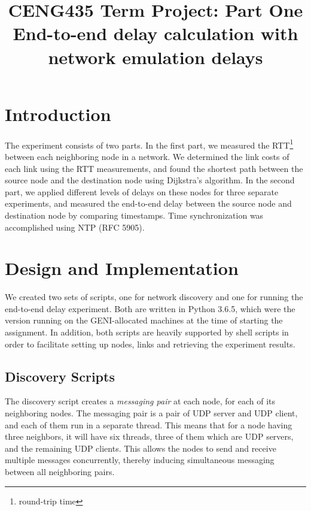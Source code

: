 \documentclass[conference]{IEEEtran}
\begin{document}
\title{%
  CENG435 Term Project: Part One \\
  \large End-to-end delay calculation with network emulation delays}

\author{
    \IEEEauthorblockA{}
\and
    \IEEEauthorblockA{}
}

\maketitle

\section{Introduction}
The experiment consists of two parts. In the first part, we measured the RTT\footnote{round-trip time}
between each neighboring node in a network. We determined the link costs of each link using the RTT
measurements, and found the shortest path between the source node and the destination node using
Dijkstra's algorithm. In the second part, we applied different levels of delays on these nodes for
three separate experiments, and measured the end-to-end delay between the source node and destination
node by comparing timestamps. Time synchronization was accomplished using NTP (RFC 5905).

\section{Design and Implementation}
We created two sets of scripts, one for network discovery and one for running the end-to-end delay
experiment. Both are written in Python 3.6.5, which were the version running on the GENI-allocated
machines at the time of starting the assignment. In addition, both scripts are heavily supported by
shell scripts in order to facilitate setting up nodes, links and retrieving the experiment results.


\subsection{Discovery Scripts}
The discovery script creates a \textit{messaging pair} at each node, for each of its
neighboring nodes. The messaging pair is a pair of UDP server and UDP client, and each of them
run in a separate thread. This means that for a node having three neighbors, it will have six
threads, three of them which are UDP servers, and the remaining UDP clients.
This allows the nodes to send and receive multiple messages concurrently,
thereby inducing simultaneous messaging between all neighboring pairs.
\end{document}
